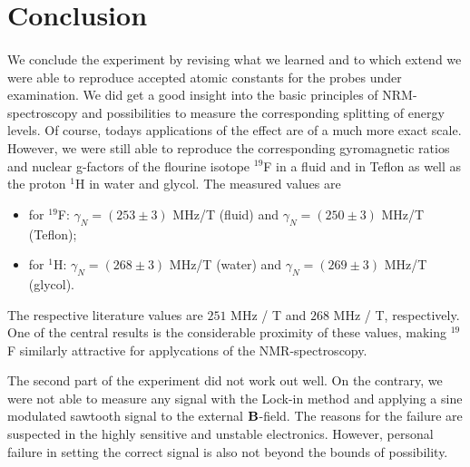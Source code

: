 \section{Conclusion}
\paragraph{}
We conclude the experiment by revising what we learned and to which extend we were 
able to reproduce accepted atomic constants for the probes under examination. 
We did get a good insight into the basic principles of NRM-spectroscopy and possibilities 
to measure the corresponding splitting of energy levels. Of course, todays applications 
of the effect are of a much more exact scale. However, we were still able to reproduce 
the corresponding gyromagnetic ratios and nuclear g-factors of
the flourine isotope $^{19}$F in a fluid and in Teflon as well as the proton $^1$H in water 
and glycol. The measured values are 
\begin{itemize}
    \item
        for $^{19}$F: $\gamma_N = (253 \pm 3)$ MHz/T (fluid) and 
        $\gamma_N = (250 \pm 3)$ MHz/T (Teflon);
    \item
        for $^1$H: $\gamma_N = (268 \pm 3)$ MHz/T (water) and 
        $\gamma_N = (269 \pm 3)$ MHz/T (glycol).
\end{itemize}
The respective literature values are $251$ MHz / T  and $268$ MHz / T, respectively. 
One of the central results is the considerable proximity of these values, making 
$^{19}$F similarly attractive for applycations of the NMR-spectroscopy. 

The second part of the experiment did not work out well. On the contrary, we were not able 
to measure any signal with the Lock-in method and applying a sine modulated sawtooth signal 
to the external $\mathbf{B}$-field. The reasons for the failure are suspected in the highly sensitive 
and unstable electronics. However, personal failure in setting the correct signal is also 
not beyond the bounds of possibility. 
